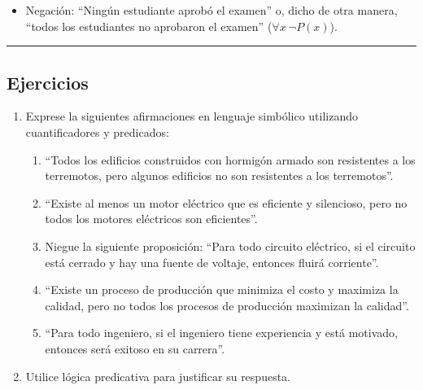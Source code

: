 \begin{enumerate}[label=\roman*)]
\begin{fmd-example}
\begin{itemize}
		\item Negación: ``Ningún estudiante aprobó el examen'' o, dicho de otra manera, ``todos los estudiantes no aprobaron el examen'' ($\forall x \ \neg P(x)$).
		\end{itemize}
	\end{fmd-example}
\end{enumerate}

\rule{\textwidth}{.5pt}

\subsection{Ejercicios}

\begin{enumerate}[label=\textbf{\arabic*}.]
	
	\item Exprese la siguientes afirmaciones en lenguaje simbólico utilizando cuantificadores y predicados:
	\begin{enumerate}
		\item ``Todos los edificios construidos con hormigón armado son resistentes a los terremotos, pero algunos edificios no son resistentes a los terremotos''.
		
		\item ``Existe al menos un motor eléctrico que es eficiente y silencioso, pero no todos los motores eléctricos son eficientes''.
		
		\item Niegue la siguiente proposición: ``Para todo circuito eléctrico, si el circuito está cerrado y hay una fuente de voltaje, entonces fluirá corriente''.
		
		\item ``Existe un proceso de producción que minimiza el costo y maximiza la calidad, pero no todos los procesos de producción maximizan la calidad''.
		
		\item ``Para todo ingeniero, si el ingeniero tiene experiencia y está motivado, entonces será exitoso en su carrera''.
	\end{enumerate}
	
	\item Utilice lógica predicativa para justificar su respuesta.
	

\end{enumerate}
